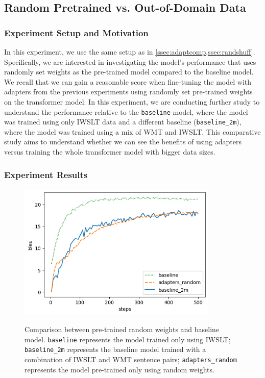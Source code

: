 \subsection{Random Pretrained vs. Out-of-Domain Data}
\label{ssec:randpre}
\subsubsection{Experiment Setup and Motivation}
In this experiment, we use the same setup as in \cref{ssec:adaptcomp,ssec:randshuff}. Specifically, we are interested in investigating the model's performance that uses randomly set weights as the pre-trained model compared to the baseline model. We recall that we can gain a reasonable score when fine-tuning the model with adapters from the previous experiments using randomly set pre-trained weights on the transformer model. In this experiment, we are conducting further study to understand the performance relative to the \texttt{baseline} model, where the model was trained using only IWSLT data and a different baseline (\texttt{baseline\_2m}), where the model was trained using a mix of WMT and IWSLT. This comparative study aims to understand whether we can see the benefits of using adapters versus training the whole transformer model with bigger data sizes.

\subsubsection{Experiment Results}

\begin{figure}[h]
    {\includegraphics[width=0.85\textwidth]{img/random.png}}
    \centering
    \caption[Comparison between pre-trained random weights and baseline model.]{Comparison between pre-trained random weights and baseline model. \texttt{baseline} represents the model trained only using IWSLT; \texttt{baseline\_2m} represents the baseline model trained with a combination of IWSLT and WMT sentence pairs; \texttt{adapters\_random} represents the model pre-trained only using random weights.}
    \label{img:rndbslcmp}
\end{figure}

